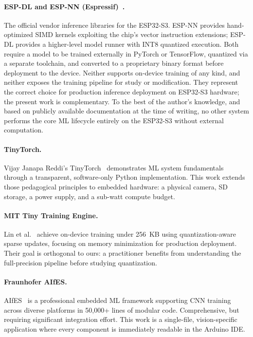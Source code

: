 \documentclass[12pt]{article}
\begin{document}
\paragraph{ESP-DL and ESP-NN (Espressif)~\cite{espdl_github,espnn_github}.}
The official vendor inference libraries for the ESP32-S3.
ESP-NN provides hand-optimized SIMD kernels exploiting the chip's vector
instruction extensions; ESP-DL provides a higher-level model runner with INT8
quantized execution.
Both require a model to be trained externally in PyTorch or TensorFlow,
quantized via a separate toolchain, and converted to a proprietary binary format
before deployment to the device.
Neither supports on-device training of any kind, and neither exposes the training
pipeline for study or modification.
They represent the correct choice for production inference deployment on ESP32-S3
hardware; the present work is complementary.
To the best of the author's knowledge, and based on publicly available documentation at the
time of writing, no other system performs the core ML lifecycle entirely on the
ESP32-S3 without external computation.

\paragraph{TinyTorch.}
Vijay Janapa Reddi's TinyTorch~\cite{reddi2024tinytorch} demonstrates ML system
fundamentals through a transparent, software-only Python implementation.
This work extends those pedagogical principles to embedded hardware: a physical
camera, SD storage, a power supply, and a sub-watt compute budget.

\paragraph{MIT Tiny Training Engine.}
Lin et al.~\cite{lin2022ondevice} achieve on-device training under 256~KB using
quantization-aware sparse updates, focusing on memory minimization for production
deployment.
Their goal is orthogonal to ours: a practitioner benefits from understanding the
full-precision pipeline before studying quantization.

\paragraph{Fraunhofer AIfES.}
AIfES~\cite{wulfert2024aifes,aifes_github} is a professional embedded ML
framework supporting CNN training across diverse platforms in 50{,}000+ lines of
modular code.
Comprehensive, but requiring significant integration effort.
This work is a single-file, vision-specific application where every component is
immediately readable in the Arduino IDE.
\end{document}
